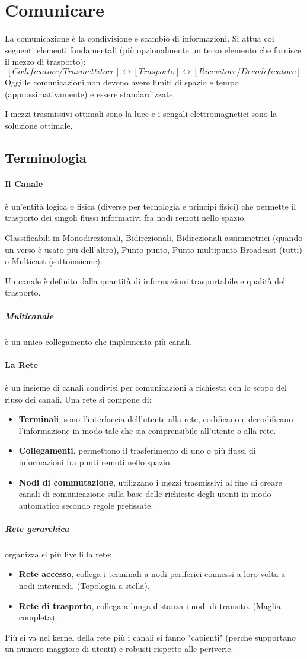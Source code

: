 \section{Comunicare}
La comunicazione è la condivisione e scambio di informazioni. Si attua coi seguenti elementi fondamentali (più opzionalmente un terzo elemento che fornisce il mezzo di trasporto): \footnotesize\[[Codificatore/Trasmettitore] \longleftrightarrow [Trasporto] \longleftrightarrow [Ricevitore/Decodificatore]\] \normalsize Oggi le comunicazioni non devono avere limiti di spazio e tempo (approssimativamente) e essere standardizzate.

I mezzi trasmissivi ottimali sono la luce e i sengali elettromagnetici sono la soluzione ottimale.
\subsection{Terminologia}
\paragraph{Il Canale} è un'entità logica o fisica (diverse per tecnologia e principi fisici) che permette il trasporto dei singoli flussi informativi fra nodi remoti nello spazio.

Classificabili in Monodirezionali, Bidirezionali, Bidirezionali assimmetrici (quando un verso è usato più dell'altro), Punto-punto, Punto-multipunto Broadcast (tutti) o Multicast (sottoinsieme).

Un canale è definito dalla quantità di informazioni trasportabile e qualità del trasporto.
\subparagraph{Multicanale} è un unico collegamento che implementa più canali.
\paragraph{La Rete} è un insieme di canali condivisi per comunicazioni a richiesta con lo scopo del riuso dei canali. Una rete si compone di:
\begin{itemize}
	\item \textbf{Terminali}, sono l'interfaccia dell'utente alla rete, codificano e decodificano l'informazione in modo tale che sia comprensibile all'utente o alla rete.
	\item \textbf{Collegamenti}, permettono il trasferimento di uno o più flussi di informazioni fra punti remoti nello spazio.
	\item \textbf{Nodi di commutazione}, utilizzano i mezzi trasmissivi al fine di creare canali di comunicazione sulla base delle richieste degli utenti in modo automatico secondo regole prefissate.
\end{itemize}
\subparagraph{Rete gerarchica} organizza si più livelli la rete:
\begin{itemize}
	\item \textbf{Rete accesso}, collega i terminali a nodi periferici connessi a loro volta a nodi intermedi. (Topologia a stella).
	\item \textbf{Rete di trasporto}, collega a lunga distanza i nodi di transito. (Maglia completa).
\end{itemize}
Più si va nel kernel della rete più i canali si fanno "capienti" (perchè supportano un numero maggiore di utenti) e robusti rispetto alle periverie.
